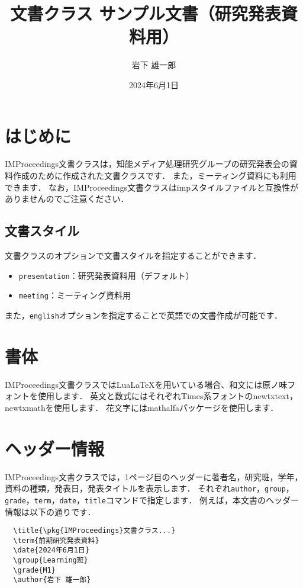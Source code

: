 \documentclass[
  platex,
  dvipdfmx,
  presentation
]{improceedings}
\title{\pkg{IMProceedings}文書クラス サンプル文書（研究発表資料用）}
\date{2024年6月1日}
\author{岩下 雄一郎}
\newcommand{\pkg}[1]{\textsf{#1}}
\newcommand{\code}[1]{\texttt{#1}}
\begin{document}
\maketitle

\section{はじめに}

\pkg{IMProceedings}文書クラスは，知能メディア処理研究グループの研究発表会の資料作成のために作成された文書クラスです．
また，ミーティング資料にも利用できます．
なお，\pkg{IMProceedings}文書クラスは\pkg{imp}スタイルファイルと互換性がありませんのでご注意ください．

\subsection{文書スタイル}

文書クラスのオプションで文書スタイルを指定することができます．
\begin{itemize}
  \item \code{presentation}：研究発表資料用（デフォルト）
  \item \code{meeting}：ミーティング資料用
\end{itemize}
また，\code{english}オプションを指定することで英語での文書作成が可能です．

\section{書体}

\pkg{IMProceedings}文書クラスではLuaLaTeXを用いている場合、和文には原ノ味フォントを使用します．
英文と数式にはそれぞれTimes系フォントの\pkg{newtxtext}，\pkg{newtxmath}を使用します．
花文字には\pkg{mathalfa}パッケージを使用します．

\section{ヘッダー情報}

\pkg{IMProceedings}文書クラスでは，1ページ目のヘッダーに著者名，研究班，学年，資料の種類，発表日，発表タイトルを表示します．
それぞれ\code{author}，\code{group}，\code{grade}，\code{term}，\code{date}，\code{title}コマンドで指定します．
例えば，本文書のヘッダー情報は以下の通りです．
\begin{verbatim}
  \title{\pkg{IMProceedings}文書クラス...}
  \term{前期研究発表資料}
  \date{2024年6月1日}
  \group{Learning班}
  \grade{M1}
  \author{岩下 雄一郎}
\end{verbatim}
\end{document}
